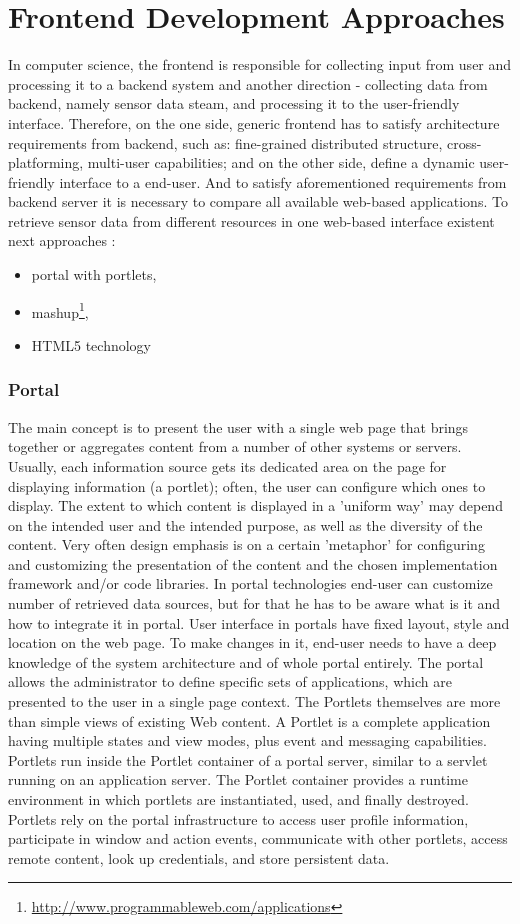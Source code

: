 \section{Frontend Development Approaches}
In computer science, the frontend is responsible for collecting input from user and processing it to a backend system and another direction - collecting data from backend, namely sensor data steam, and processing it to the user-friendly interface. Therefore, on the one side, generic frontend has to satisfy architecture requirements from backend, such as: fine-grained distributed structure, cross-platforming, multi-user capabilities; and on the other side, define a dynamic user-friendly interface to a end-user. And to satisfy aforementioned requirements from backend server it is necessary to compare all available web-based applications.
\newline
To retrieve sensor data from different resources in one web-based interface existent next approaches :
\begin{itemize}
 \item portal with portlets,
 \item mashup\footnote{\url{http://www.programmableweb.com/applications}},
 \item HTML5 technology
\end{itemize}
	\subsubsection{Portal}
		The main concept is to present the user with a single web page that brings together or aggregates content from a number of other systems or servers. Usually, each information source gets its dedicated area on the page for displaying information (a portlet); often, the user can configure which ones to display. The extent to which content is displayed in a 'uniform way' may depend on the intended user and the intended purpose, as well as the diversity of the content. Very often design emphasis is on a certain 'metaphor' for configuring and customizing the presentation of the content and the chosen implementation framework and/or code libraries\cite{pautasso2008restful,seong2006usability}. In portal technologies end-user can customize number of retrieved data sources, but for that he has to be aware what is it and how to integrate it in portal. User interface in portals have fixed layout, style and location on the web page. To make changes in it, end-user needs to have a deep knowledge of the system architecture and of whole portal entirely. The portal allows the administrator to define specific sets of applications, which are presented to the user in a single page context. The Portlets themselves are more than simple views of existing Web content. A Portlet is a complete application having multiple states and view modes, plus event and messaging capabilities.
		Portlets run inside the Portlet container of a portal server, similar to a servlet running on an application server. The Portlet container provides a runtime environment in which portlets are instantiated, used, and finally destroyed. Portlets rely on the portal infrastructure to access user profile information, participate in window and action events, communicate with other portlets, access remote content, look up credentials, and store persistent data.
